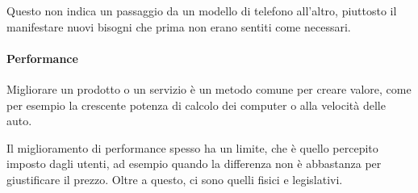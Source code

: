 Questo non indica un passaggio da un modello di telefono all'altro, piuttosto
il manifestare nuovi bisogni che prima non erano sentiti come necessari.

\paragraph*{Performance} Migliorare un prodotto o un servizio è un metodo
comune per creare valore, come per esempio la crescente potenza di calcolo dei
computer o alla velocità delle auto.

Il miglioramento di performance spesso ha un limite, che è quello percepito
imposto dagli utenti, ad esempio quando la differenza non è abbastanza per
giustificare il prezzo. Oltre a questo, ci sono quelli fisici e legislativi.
